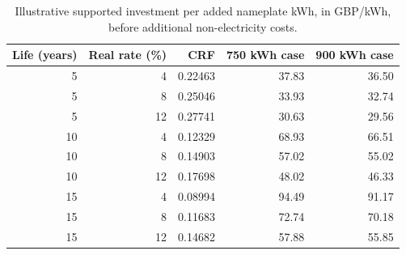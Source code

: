 \begin{table}[htbp]
\centering\small
\caption{Illustrative supported investment per added nameplate kWh, in GBP/kWh, before additional non-electricity costs.}\label{tab:financial-range}
\begin{tabular}{@{}rrrrr@{}}\toprule
Life (years) & Real rate (\%) & CRF & 750 kWh case & 900 kWh case \\\midrule
5 & 4 & 0.22463 & 37.83 & 36.50 \\
5 & 8 & 0.25046 & 33.93 & 32.74 \\
5 & 12 & 0.27741 & 30.63 & 29.56 \\
10 & 4 & 0.12329 & 68.93 & 66.51 \\
10 & 8 & 0.14903 & 57.02 & 55.02 \\
10 & 12 & 0.17698 & 48.02 & 46.33 \\
15 & 4 & 0.08994 & 94.49 & 91.17 \\
15 & 8 & 0.11683 & 72.74 & 70.18 \\
15 & 12 & 0.14682 & 57.88 & 55.85 \\
\bottomrule\end{tabular}
\end{table}
